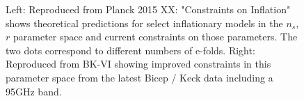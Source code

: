 \documentclass[12pt]{article}
\begin{document}
\begin{figure}
	\caption{Left: Reproduced from Planck 2015 XX: "Constraints on
	Inflation"\cite{PlanckXX}
	shows theoretical predictions for select inflationary models in
	the $n_s$,$r$ parameter space and current constraints on those
	parameters. The two dots correspond to different numbers of e-folds.
	Right: Reproduced from BK-VI \cite{BK6} showing improved constraints in this
	parameter space from the latest Bicep / Keck data including a 95GHz band.}
	\label{fig:status}
\end{figure}
\end{document}
